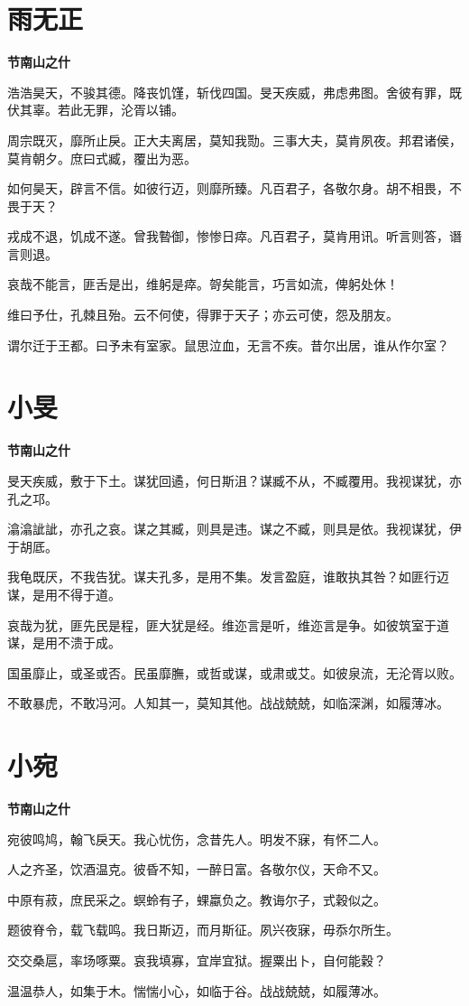 \documentclass[12pt,a4paper]{ctexbook}
\begin{document}
\section{雨无正}
\textbf{节南山之什}\par\vspace{0.5em}
浩浩昊天，不骏其德。降丧饥馑，斩伐四国。旻天疾威，弗虑弗图。舍彼有罪，既伏其辜。若此无罪，沦胥以铺。\par
周宗既灭，靡所止戾。正大夫离居，莫知我勚。三事大夫，莫肯夙夜。邦君诸侯，莫肯朝夕。庶曰式臧，覆出为恶。\par
如何昊天，辟言不信。如彼行迈，则靡所臻。凡百君子，各敬尔身。胡不相畏，不畏于天？\par
戎成不退，饥成不遂。曾我暬御，惨惨日瘁。凡百君子，莫肯用讯。听言则答，谮言则退。\par
哀哉不能言，匪舌是出，维躬是瘁。哿矣能言，巧言如流，俾躬处休！\par
维曰予仕，孔棘且殆。云不何使，得罪于天子；亦云可使，怨及朋友。\par
谓尔迁于王都。曰予未有室家。鼠思泣血，无言不疾。昔尔出居，谁从作尔室？\par

\section{小旻}
\textbf{节南山之什}\par\vspace{0.5em}
旻天疾威，敷于下土。谋犹回遹，何日斯沮？谋臧不从，不臧覆用。我视谋犹，亦孔之邛。\par
潝潝訿訿，亦孔之哀。谋之其臧，则具是违。谋之不臧，则具是依。我视谋犹，伊于胡厎。\par
我龟既厌，不我告犹。谋夫孔多，是用不集。发言盈庭，谁敢执其咎？如匪行迈谋，是用不得于道。\par
哀哉为犹，匪先民是程，匪大犹是经。维迩言是听，维迩言是争。如彼筑室于道谋，是用不溃于成。\par
国虽靡止，或圣或否。民虽靡膴，或哲或谋，或肃或艾。如彼泉流，无沦胥以败。\par
不敢暴虎，不敢冯河。人知其一，莫知其他。战战兢兢，如临深渊，如履薄冰。\par

\section{小宛}
\textbf{节南山之什}\par\vspace{0.5em}
宛彼鸣鸠，翰飞戾天。我心忧伤，念昔先人。明发不寐，有怀二人。\par
人之齐圣，饮酒温克。彼昏不知，一醉日富。各敬尔仪，天命不又。\par
中原有菽，庶民采之。螟蛉有子，蜾蠃负之。教诲尔子，式穀似之。\par
题彼脊令，载飞载鸣。我日斯迈，而月斯征。夙兴夜寐，毋忝尔所生。\par
交交桑扈，率场啄粟。哀我填寡，宜岸宜狱。握粟出卜，自何能穀？\par
温温恭人，如集于木。惴惴小心，如临于谷。战战兢兢，如履薄冰。\par
\end{document}
